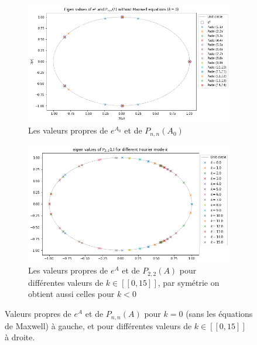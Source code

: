 \begin{figure}
  \begin{subfigure}{.5\textwidth}
    \centering
    \includegraphics[width=\textwidth]{img/approx_evA0P.png}
    \caption{Les valeurs propres de $e^{A_0}$ et de $P_{n,n}(A_0)$}
  \end{subfigure}
  \begin{subfigure}{.5\textwidth}
    \centering
    \includegraphics[width=\textwidth]{img/approx_evAkP22.png}
    \caption{Les valeurs propres de $e^{A}$ et de $P_{2,2}(A)$ pour différentes valeurs de $k\in[\![0,15]\!]$, par symétrie on obtient aussi celles pour $k<0$}
  \end{subfigure}
  \caption{Valeurs propres de $e^{A}$ et de $P_{n,n}(A)$ pour $k=0$ (sans les équations de Maxwell) à gauche, et pour différentes valeurs de $k\in[\![0,15]\!]$ à droite.}
  \label{fig:evAP22}
\end{figure}


